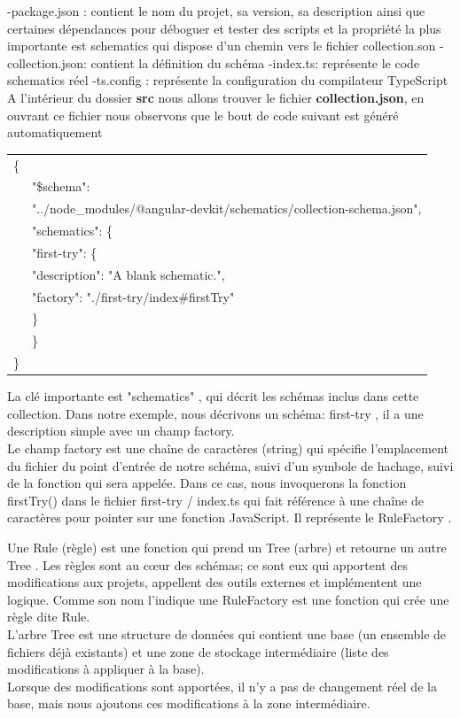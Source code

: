 \documentclass[12pt,french]{article}
\begin{document}
	-package.json : contient le nom du projet, sa version, sa description ainsi que certaines dépendances pour déboguer et tester des scripts et la propriété la plus importante est schematics qui dispose d’un chemin vers le fichier collection.son\smallbreak
	-collection.json: contient la définition du schéma\smallbreak
	-index.ts: représente le code schematics réel\smallbreak
	-ts.config : représente la configuration du compilateur TypeScript\newline	
	A l'intérieur du dossier \textbf{src} nous allons trouver le fichier \textbf{collection.json}, en ouvrant ce fichier nous observons que le bout de code suivant est généré automatiquement\newline
	
	\begin{tabular}{ll}
		\{&\\
		&"\$schema":\\ &"../node\_modules/@angular-devkit/schematics/collection-schema.json",\\
		&"schematics": \{\\
		&\quad"first-try": \{
\\
		&\qquad"description": "A blank schematic.",
\\
		&\qquad"factory": "./first-try/index\#firstTry"\\
		&\quad \}
\\
		& \}
\\
		\}
	\end{tabular}\break

	La clé importante est "schematics" , qui décrit les schémas inclus dans cette collection. 
	Dans notre exemple, nous décrivons un schéma: first-try , il a une description simple avec un champ factory.\\
	Le champ factory est une chaîne de caractères (string) qui spécifie l'emplacement du fichier du point d'entrée de notre schéma, suivi d'un symbole de hachage, suivi de la fonction qui sera appelée. Dans  ce cas, nous invoquerons la fonction firstTry() dans le fichier first-try / index.ts  qui fait référence à une chaîne de caractères pour pointer sur une fonction JavaScript. Il représente le RuleFactory .\newline 
	
	Une Rule (règle) est une fonction qui prend un Tree (arbre) et retourne un autre Tree . Les règles sont au cœur des schémas; ce sont eux qui apportent des modifications aux projets, appellent des outils externes et implémentent une logique. Comme son nom l'indique une RuleFactory est une fonction qui crée une règle dite Rule.\\
	L'arbre Tree est une structure de données qui contient une base (un ensemble de fichiers déjà existants) et une zone de stockage intermédiaire (liste des modifications à appliquer à la base).\\
	Lorsque des modifications sont apportées, il n'y a pas de changement réel de la base, mais nous ajoutons ces modifications à la zone intermédiaire.\newline
	
\end{document}
